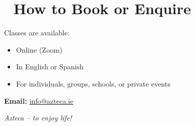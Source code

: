 \documentclass[12pt]{article}
\begin{document}
\section*{🎉 How to Book or Enquire}

Classes are available:
\begin{itemize}
\item Online (Zoom)
\item In English or Spanish
\item For individuals, groups, schools, or private events
\end{itemize}

\textbf{Email:} \href{mailto:info@azteca.ie}{info@azteca.ie}

\vfill
\begin{center}
\textit{Azteca – to enjoy life!}
\end{center}
\end{document}
